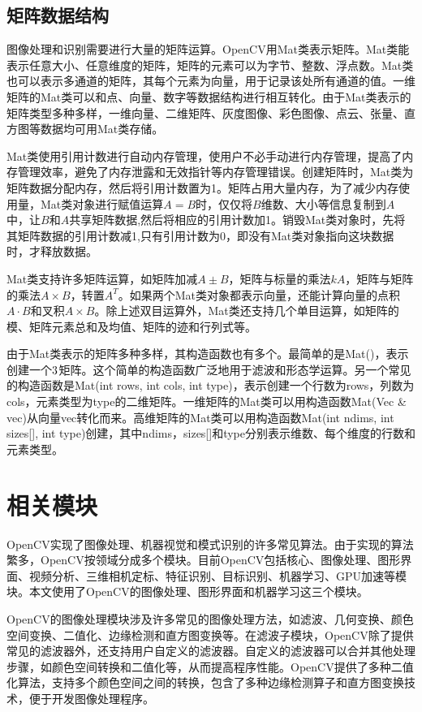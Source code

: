 \subsection{矩阵数据结构}


图像处理和识别需要进行大量的矩阵运算。OpenCV用Mat类表示矩阵。Mat类能表示任意大小、任意维度的矩阵，矩阵的元素可以为字节、整数、浮点数。Mat类也可以表示多通道的矩阵，其每个元素为向量，用于记录该处所有通道的值。一维矩阵的Mat类可以和点、向量、数字等数据结构进行相互转化。由于Mat类表示的矩阵类型多种多样，一维向量、二维矩阵、灰度图像、彩色图像、点云、张量、直方图等数据均可用Mat类存储。

Mat类使用引用计数进行自动内存管理，使用户不必手动进行内存管理，提高了内存管理效率，避免了内存泄露和无效指针等内存管理错误。创建矩阵时，Mat类为矩阵数据分配内存，然后将引用计数置为1。矩阵占用大量内存，为了减少内存使用量，Mat类对象进行赋值运算$A=B$时，仅仅将$B$维数、大小等信息复制到$A$中，让$B$和$A$共享矩阵数据,然后将相应的引用计数加1。销毁Mat类对象时，先将其矩阵数据的引用计数减1,只有引用计数为0，即没有Mat类对象指向这块数据时，才释放数据。

Mat类支持许多矩阵运算，如矩阵加减$A\pm B$，矩阵与标量的乘法$kA$，矩阵与矩阵的乘法$A\times B$，转置$A^T$。如果两个Mat类对象都表示向量，还能计算向量的点积$A\cdot B$和叉积$A\times B$。除上述双目运算外，Mat类还支持几个单目运算，如矩阵的模、矩阵元素总和及均值、矩阵的迹和行列式等。

由于Mat类表示的矩阵多种多样，其构造函数也有多个。最简单的是Mat()，表示创建一个$3\time 3$矩阵。这个简单的构造函数广泛地用于滤波和形态学运算。另一个常见的构造函数是Mat(int rows, int cols, int type)，表示创建一个行数为rows，列数为cols，元素类型为type的二维矩阵。一维矩阵的Mat类可以用构造函数Mat(Vec \& vec)从向量vec转化而来。高维矩阵的Mat类可以用构造函数Mat(int ndims, int sizes[], int type)创建，其中ndims，sizes[]和type分别表示维数、每个维度的行数和元素类型。

\section{相关模块}

OpenCV实现了图像处理、机器视觉和模式识别的许多常见算法。由于实现的算法繁多，OpenCV按领域分成多个模块。目前OpenCV包括核心、图像处理、图形界面、视频分析、三维相机定标、特征识别、目标识别、机器学习、GPU加速等模块。本文使用了OpenCV的图像处理、图形界面和机器学习这三个模块。

OpenCV的图像处理模块涉及许多常见的图像处理方法，如滤波、几何变换、颜色空间变换、二值化、边缘检测和直方图变换等。在滤波子模块，OpenCV除了提供常见的滤波器外，还支持用户自定义的滤波器。自定义的滤波器可以合并其他处理步骤，如颜色空间转换和二值化等，从而提高程序性能。OpenCV提供了多种二值化算法，支持多个颜色空间之间的转换，包含了多种边缘检测算子和直方图变换技术，便于开发图像处理程序。

